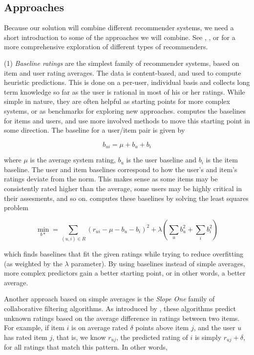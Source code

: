 \subsection{Approaches}

Because our solution will combine different recommender systems, we need a short introduction to some of the approaches we will combine.
See \cite{Adomavicius2005}, \cite{Pazzani2007}, \cite{Schafer2007} or \cite{Bjorkoy2010d} for a more comprehensive exploration of different types of recommenders.

(1) \emph{Baseline ratings} are the simplest family of recommender systems, based on item and user rating averages.
The data is content-based, and used to compute heuristic predictions. 
This is done on a per-user, individual basis and collects long term knowledge
so far as the user is rational in most of his or her ratings.
While simple in nature, they are often helpful as starting points for more complex systems, or as 
benchmarks for exploring new approaches. \cite[p2]{Koren2008} computes the baselines for items and users, and
use more involved methods to move this starting point in some direction. 
The baseline for a user/item pair is given by

\begin{equation*}
  b_{ui} = \mu + b_u + b_i
\end{equation*}

where $\mu$ is the average system rating, $b_u$ is the user baseline and $b_i$ is the item baseline.
The user and item baselines correspond to how the user's and item's ratings deviate from the norm.
This makes sense as some items may be consistently rated higher than the average, some users may be 
highly critical in their assesments, and so on. \citeauthor{Koren2008} computes these baselines by solving the
least squares problem

\begin{equation*}
  \min_{b*} = \sum_{(u,i) \in R} (r_{ui} - \mu - b_u - b_i)^2 + \lambda ( \sum_{u} b_u^2 + \sum_{i} b_i^2 )
\end{equation*}

which finds baselines that fit the given ratings while trying to reduce overfitting
(as weighted by the $\lambda$ parameter). 
By using baselines instead of simple averages, more complex predictors gain a better starting point,
or in other words, a better average.

Another approach based on simple averages is the  \emph{Slope One} family of collaborative filtering algorithms. 
As introduced by \cite{Lemire2005}, these algorithms predict unknown ratings based on the average difference in ratings between two items. 
For example, if item $i$ is on average rated $\delta$ points above item $j$, and the user $u$ has rated item $j$,
that is, we know $r_{uj}$, the predicted rating of $i$ is simply $r_{uj} + \delta$, for all ratings that match this pattern.
In other words,

